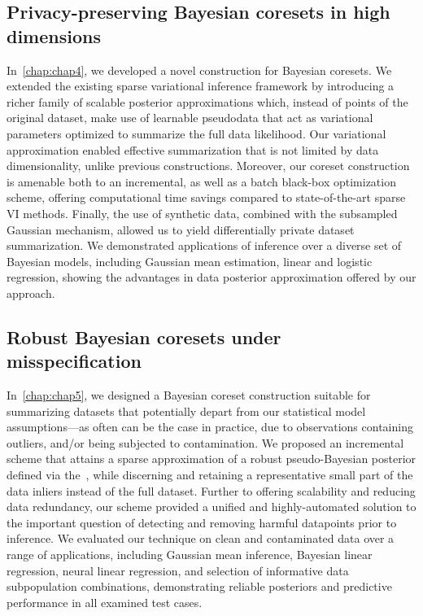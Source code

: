 \subsection{Privacy-preserving Bayesian coresets in high dimensions}
\label{subsec:ch4-summary}
In~\cref{chap:chap4}, we developed a novel construction for Bayesian coresets. We extended the existing sparse variational inference framework by introducing a richer family of scalable posterior approximations which, instead of points of the original dataset, make use of learnable pseudodata that act as variational parameters optimized to summarize the full data likelihood. Our variational approximation enabled effective summarization that is not limited by data dimensionality, unlike previous constructions. Moreover, our coreset construction is amenable both to an incremental, as well as a batch black-box optimization scheme, offering computational time savings compared to state-of-the-art sparse VI methods. Finally, the use of synthetic data, combined with the subsampled Gaussian mechanism, allowed us to yield differentially private dataset summarization. We demonstrated applications of inference over a diverse set of Bayesian models, including Gaussian mean estimation, linear and logistic regression, showing the advantages in data posterior approximation offered by our approach.

\subsection{Robust Bayesian coresets under misspecification}
\label{subsec:ch4-summary}
In~\cref{chap:chap5}, we designed a Bayesian coreset construction suitable for summarizing datasets that potentially depart from our statistical model assumptions---as often can be the case in practice, due to observations containing outliers, and/or being subjected to contamination. We proposed an incremental scheme that attains a sparse approximation of a robust pseudo-Bayesian posterior defined via the~\bdiv, while discerning and retaining a representative small part of the data inliers instead of the full dataset. Further to offering scalability and reducing data redundancy, our scheme provided a unified and highly-automated solution to the important question of detecting and removing harmful datapoints prior to inference. We evaluated our technique on clean and contaminated data over a range of applications, including Gaussian mean inference, Bayesian linear regression, neural linear regression, and selection of informative data subpopulation combinations, demonstrating reliable posteriors and predictive performance in all examined test cases.



